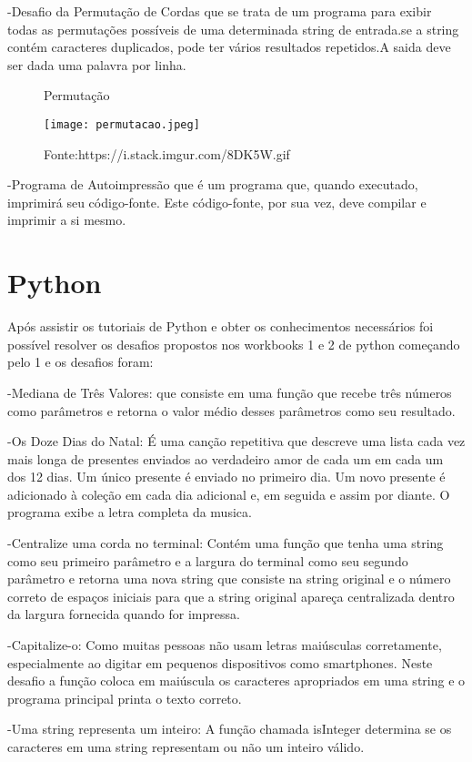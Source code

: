     -Desafio da Permutação de Cordas que se trata de um programa para exibir todas as permutações possíveis de uma determinada string de entrada.se a string contém caracteres duplicados, pode ter vários resultados repetidos.A saida deve ser dada uma palavra por linha.

\begin{figure} [h!]	
    \centering
    \caption{Permutação}
    \texttt{[image: permutacao.jpeg]}
    \caption*{Fonte:https://i.stack.imgur.com/8DK5W.gif}
    \label{fig:permutacaodeletras}
\end{figure}

    -Programa de Autoimpressão que é um programa que, quando executado, imprimirá seu código-fonte. Este código-fonte, por sua vez, deve compilar e imprimir a si mesmo. 
\section{Python}
Após assistir os tutoriais de Python e obter os conhecimentos necessários foi possível resolver os desafios propostos nos workbooks 1 e 2 de python começando pelo 1 e os desafios foram: 

-Mediana de Três Valores: que consiste em uma função que recebe três números como parâmetros e retorna o valor médio desses parâmetros como seu resultado.

-Os Doze Dias do Natal: É uma canção repetitiva que descreve uma lista cada vez mais longa de presentes enviados ao verdadeiro amor de cada um em cada um dos 12 dias. Um único presente é enviado no primeiro dia. Um novo presente é adicionado à coleção em cada dia adicional e, em seguida e assim por diante.
O programa exibe a letra completa da musica.

-Centralize uma corda no terminal: Contém uma função que tenha uma string como seu primeiro parâmetro e a largura do terminal como seu segundo parâmetro e retorna uma nova string que consiste na string original e o número correto de espaços iniciais para que a string original apareça centralizada dentro da largura fornecida quando for impressa.

-Capitalize-o: Como muitas pessoas não usam letras maiúsculas corretamente, especialmente ao digitar em pequenos dispositivos como smartphones. Neste desafio a função coloca em maiúscula os caracteres apropriados em uma string e o programa principal printa o texto correto.

-Uma string representa um inteiro: A função chamada isInteger determina se os caracteres em uma string representam ou não um inteiro válido.

